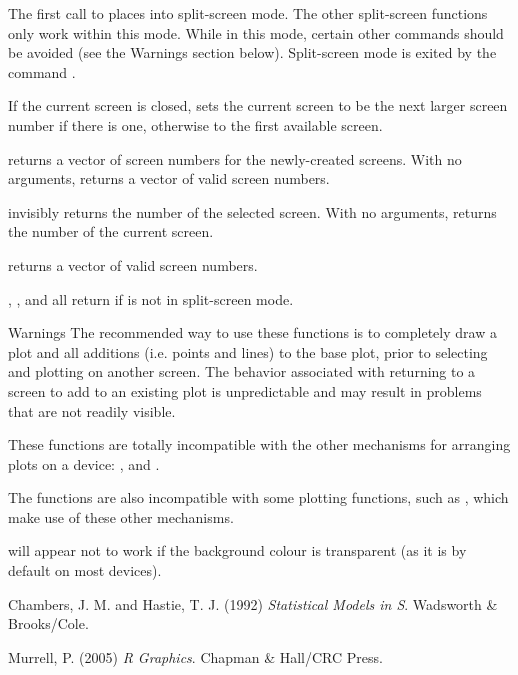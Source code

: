 %
\begin{Details}\relax
The first call to  places \R{} into split-screen
mode.  The other split-screen functions only work within this mode.
While in this mode, certain other commands should be avoided (see the
Warnings section below).  Split-screen mode is exited by the command
.

If the current screen is closed,  sets the current
screen to be the next larger screen number if there is one, otherwise
to the first available screen.
\end{Details}
%
\begin{Value}
 returns a vector of screen numbers for the
newly-created screens.  With no arguments,  returns
a vector of valid screen numbers.

 invisibly returns the number of the selected screen.
With no arguments,  returns the number of the current
screen.

 returns a vector of valid screen numbers.

, , and  all return
 if \R{} is not in split-screen mode.
\end{Value}
%
\begin{Section}{Warnings}
The recommended way to use these functions is to completely draw a
plot and all additions (i.e. points and lines) to the base plot, prior to
selecting and plotting on another screen. The behavior associated with
returning to a screen to add to an existing plot is unpredictable and
may result in problems that are not readily visible.

These functions are totally incompatible with the other mechanisms for
arranging plots on a device: ,
 and .

The functions are also incompatible with some plotting functions,
such as , which make use of these other mechanisms.

 will appear not to work if the background colour
is transparent (as it is by default on most devices).
\end{Section}
%
\begin{References}\relax
Chambers, J. M. and Hastie, T. J. (1992)
\emph{Statistical Models in S}.
Wadsworth \& Brooks/Cole.

Murrell, P. (2005) \emph{R Graphics}. Chapman \& Hall/CRC Press.
\end{References}
